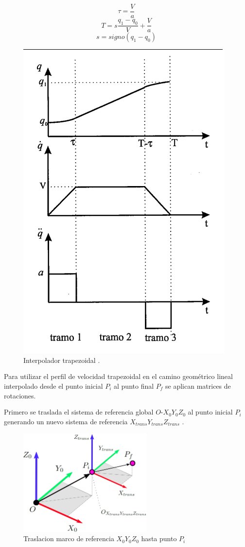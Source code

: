     \begin{equation}
        \tau=\frac{V}{a}
    \label{eq:cap6_tray_4}
    \end{equation}
    \begin{equation}
        T=s\frac{q_1-q_0}{V}+\frac{V}{a}
    \label{eq:cap6_tray_5}
    \end{equation}
    \begin{equation}
        s=signo(q_1-q_0)
    \label{eq:cap6_tray_6}
    \end{equation}
    

     \begin{figure}[htb]
            \centering
            \includegraphics[width=0.5\linewidth]{Main/Chapter6/Images6/cap6_trayectory_2.png}
            \caption{Interpolador trapezoidal \cite{tray_trape}.}
            \label{f:cap6_trayectory_2}
        \end{figure} 
    \newpage

    Para utilizar el perfil de velocidad trapezoidal en el camino geométrico lineal interpolado desde el punto inicial $P_i$ al punto final $P_f$ se aplican matrices de rotaciones. 
    
       Primero se traslada el sistema de referencia global $O$-$X_0Y_0Z_0$ al punto inicial $P_i$ generando un nuevo sistema de referencia $X_{trans}Y_{trans}Z_{trans}$ .
        
        \begin{figure}[htb]
                \centering
                \includegraphics[width=0.6\textwidth]{Main/Chapter6/Images6/DIBUJO531.jpg}
                \caption{Traslacion marco de referencia $X_0Y_0Z_0$ hasta punto $P_i$}
        \end{figure}

